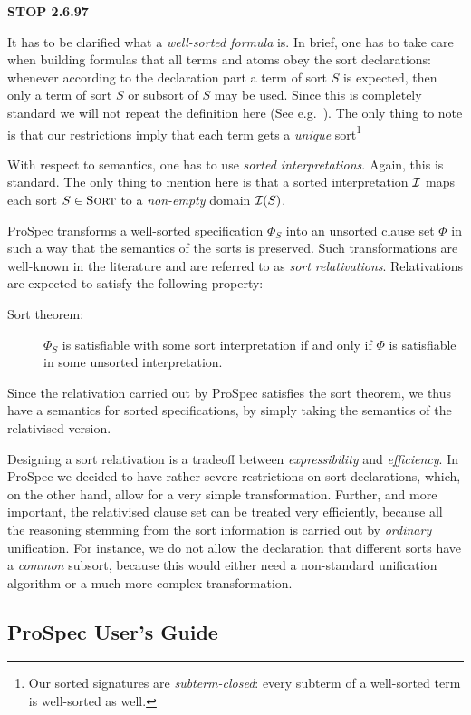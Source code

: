 \documentclass[fleqn]{scrartcl}
\newcommand{\prospec}{\textsf{ProSpec}\xspace}
\newcommand{\sort}{\textsc{Sort}\xspace}
\begin{document}
{\large\bf STOP 2.6.97}

% 


It has to be clarified what a {\em well-sorted formula\/} is. In brief,
one has to take care when building formulas that all terms and atoms
obey the sort declarations: whenever according to the declaration part
a term of sort $S$ is expected, then only a term of sort $S$ or
subsort of $S$ may be used.  
Since this is completely standard we
will not repeat the definition here (See
e.g.~\cite{Oberschelp:OrderSortedPredicateLogic:TableauSortedLogics:89}).
The only thing to note is that our restrictions imply that each term
gets a {\em unique\/} sort\footnote{Our sorted signatures are
  {\em subterm-closed\/}: every subterm of a well-sorted term is
  well-sorted as well.}

With respect to  semantics, one has to use {\em sorted
interpretations\/}. Again, this is standard. The only thing to mention
here is that a sorted interpretation $\cal I$ maps each sort $S \in \sort$ to a
{\em non-empty\/} domain ${\cal I}(S)$. 

\prospec transforms a well-sorted specification $\Phi_S$ into an unsorted
clause set $\Phi$ in such a way that the semantics of the sorts is
preserved. Such transformations are well-known in the literature and
are referred to as {\em sort relativations\/}. Relativations are expected to
satisfy the following property:
\begin{description}
\item[Sort theorem:] $\Phi_S$ is satisfiable with some sort
  interpretation if and only if $\Phi$ is satisfiable in some unsorted
  interpretation.
\end{description}
Since the relativation carried out by \prospec satisfies the sort
theorem, we thus have a semantics for sorted specifications, by simply
taking the semantics of the relativised version.

Designing a sort relativation is a tradeoff between {\em expressibility\/}
and {\em efficiency\/}. In \prospec we decided to have rather severe
restrictions on sort declarations, which, on the other hand, allow for
a very simple transformation. Further, and more important, the
relativised clause set can 
be treated very efficiently, because all the reasoning stemming from
the sort information is carried out by {\em ordinary\/} unification. 
For instance, we do not allow the declaration that different sorts
have a {\em common\/} subsort, because this would either need a
non-standard unification algorithm or a much more complex
transformation. 

\subsection{\prospec User's Guide}
\label{sec:ProspecUsersGuide}






\end{document}
